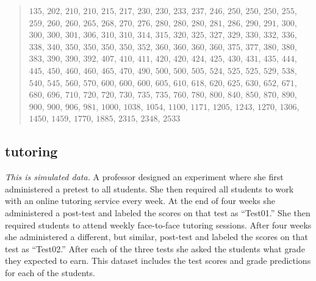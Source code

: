 \begin{quote}
  $ 135 $, $ 202 $, $ 210 $, $ 210 $, $ 215 $, $ 217 $, $ 230 $, $ 230 $, $ 233 $, $ 237 $, $ 246 $, $ 250 $, $ 250 $, $ 250 $, $ 255 $, $ 259 $, $ 260 $, $ 260 $, $ 265 $, $ 268 $, $ 270 $, $ 276 $, $ 280 $, $ 280 $, $ 280 $, $ 281 $, $ 286 $, $ 290 $, $ 291 $, $ 300 $, $ 300 $, $ 300 $, $ 301 $, $ 306 $, $ 310 $, $ 310 $, $ 314 $, $ 315 $, $ 320 $, $ 325 $, $ 327 $, $ 329 $, $ 330 $, $ 332 $, $ 336 $, $ 338 $, $ 340 $, $ 350 $, $ 350 $, $ 350 $, $ 350 $, $ 352 $, $ 360 $, $ 360 $, $ 360 $, $ 360 $, $ 375 $, $ 377 $, $ 380 $, $ 380 $, $ 383 $, $ 390 $, $ 390 $, $ 392 $, $ 407 $, $ 410 $, $ 411 $, $ 420 $, $ 420 $, $ 424 $, $ 425 $, $ 430 $, $ 431 $, $ 435 $, $ 444 $, $ 445 $, $ 450 $, $ 460 $, $ 460 $, $ 465 $, $ 470 $, $ 490 $, $ 500 $, $ 500 $, $ 505 $, $ 524 $, $ 525 $, $ 525 $, $ 529 $, $ 538 $, $ 540 $, $ 545 $, $ 560 $, $ 570 $, $ 600 $, $ 600 $, $ 600 $, $ 605 $, $ 610 $, $ 618 $, $ 620 $, $ 625 $, $ 630 $, $ 652 $, $ 671 $, $ 680 $, $ 696 $, $ 710 $, $ 720 $, $ 720 $, $ 730 $, $ 735 $, $ 735 $, $ 760 $, $ 780 $, $ 800 $, $ 840 $, $ 850 $, $ 870 $, $ 890 $, $ 900 $, $ 900 $, $ 906 $, $ 981 $, $ 1000 $, $ 1038 $, $ 1054 $, $ 1100 $, $ 1171 $, $ 1205 $, $ 1243 $, $ 1270 $, $ 1306 $, $ 1450 $, $ 1459 $, $ 1770 $, $ 1885 $, $ 2315 $, $ 2348 $, $ 2533 $
\end{quote}

\subsection{tutoring}

\textit{This is simulated data.} A professor designed an experiment where she first administered a pretest to all students. She then required all students to work with an online tutoring service every week. At the end of four weeks she administered a post-test and labeled the scores on that test as ``Test01.'' She then required students to attend weekly face-to-face tutoring sessions. After four weeks she administered a different, but similar, post-test and labeled the scores on that test as ``Test02.'' After each of the three tests she asked the students what grade they expected to earn. This dataset includes the test scores and grade predictions for each of the students.
 
